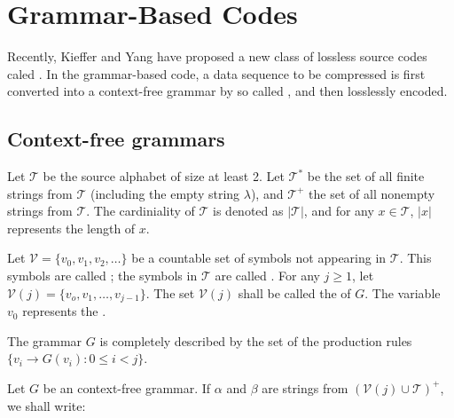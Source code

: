 \section{Grammar-Based Codes}
Recently, Kieffer and Yang \cite{Kieffer-00a} \cite{Kieffer-00b} have proposed a new class of lossless source codes caled . In the grammar-based code, a data sequence to be compressed is first converted into a context-free grammar by so called , and then losslessly encoded.

\subsection{Context-free grammars}

Let $\mathcal{T}$ be the source alphabet of size at least 2. Let $\mathcal{T}^*$ be the set of all finite strings from $\mathcal{T}$ (including the empty string $\lambda$), and $\mathcal{T}^+$ the set of all nonempty strings from $\mathcal{T}$. The cardiniality of $\mathcal{T}$ is denoted as $|\mathcal{T}|$, and for any $x \in \mathcal{T}$, $|x|$ represents the length of $x$.

Let $\mathcal{V} = \{v_0, v_1, v_2, \dots\}$ be a countable set of symbols not appearing in $\mathcal{T}$. This symbols are called ; the symbols in $\mathcal{T}$ are called . For any $j \geq 1$, let $\mathcal{V}(j) = \{v_o, v_1, \dots, v_{j-1}\}$. The set $\mathcal{V}(j)$ shall be called the  of $G$. The variable $v_0$ represents the .



The grammar $G$ is completely described by the set of the production rules $\{v_i \rightarrow G(v_i) : 0 \leq i < j\}$.

Let $G$ be an context-free grammar. If $\alpha$ and $\beta$ are strings from $(\mathcal{V}(j) \cup \mathcal{T})^+$, we shall write:

